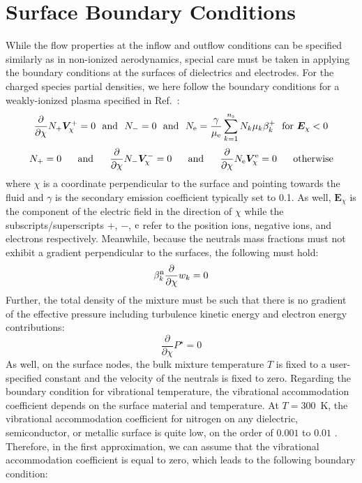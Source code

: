 \documentclass{warpdoc}
\newcommand{\ns}{{n_{\rm s}}}
\renewcommand{\vec}[1]{\bm{#1}}
\begin{document}
\section{Surface Boundary Conditions}

While the flow properties at the inflow and outflow conditions can be specified similarly as in non-ionized aerodynamics, special care must be taken in applying the boundary conditions at the surfaces of dielectrics and electrodes. For the charged species partial densities, we here follow the boundary conditions for a weakly-ionized plasma specified in Ref.\ \cite{jcp:2014:parent}:
%
\begin{equation}
\frac{\partial }{\partial \chi} N_+ \vec{V}^{+}_\chi = 0
{~~\rm and~~}
N_{-}=0
{~~\rm and~~}
N_{\rm e}=\frac{\gamma}{\mu_{\rm e}} \sum_{k=1}^\ns N_k \mu_k \beta_k^+
{~~\rm for~}
\vec{E}_\chi<0
\end{equation}
%
%
\begin{equation}
N_{+}=0
{~~~~~\rm and~~~~~}
\frac{\partial }{\partial \chi} N_- \vec{V}^{-}_\chi = 0
{~~~~~\rm and~~~~~}
\frac{\partial }{\partial \chi} N_{\rm e} \vec{V}^{\rm e}_\chi= 0
{~~~~~\rm otherwise} 
\end{equation}
%
where $\chi$ is a coordinate perpendicular to the surface and pointing towards the fluid and $\gamma$ is the secondary emission coefficient typically set to 0.1. As well, $\vec{E}_\chi$ is the component of the electric field in the direction of $\chi$ while the subscripts/superscripts $+$, $-$, $\rm e$ refer to the position ions, negative ions, and electrons respectively. Meanwhile, because the neutrals mass fractions must not exhibit a gradient perpendicular to the surfaces, the following must hold:
%
\begin{equation}
 \beta_k^{\rm n} \frac{\partial }{\partial \chi}w_{k}=0
\end{equation}
%    
Further, the total density of the mixture must be such that there is no gradient of the effective pressure including turbulence kinetic energy and electron energy contributions:
%
\begin{equation}
  \frac{\partial }{\partial \chi}P^\star=0
\end{equation}
%
As well, on the surface nodes, the bulk mixture temperature $T$ is fixed to a user-specified constant and the velocity of the neutrals is fixed to zero. Regarding the boundary condition for vibrational temperature, the vibrational accommodation coefficient depends on the surface material and temperature. At $T=300$~K, the vibrational accommodation coefficient for nitrogen on any dielectric, semiconductor, or metallic surface is quite low, on the order of $0.001$ to $0.01$ \cite{book:1977:Gershenzon,jchemp:1974:black}. Therefore, in the first approximation, we can assume that the vibrational accommodation coefficient is equal to zero, which leads to the following boundary condition:
\end{document}
